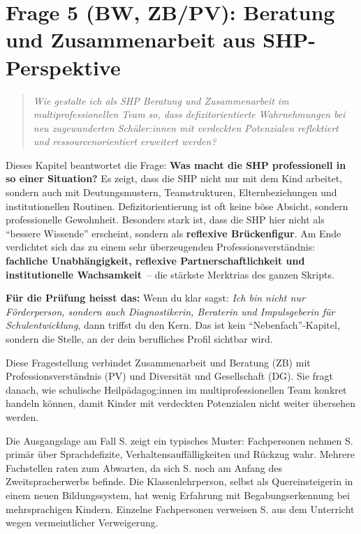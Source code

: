 \documentclass[ngerman, a4paper]{article}
\begin{document}
\newpage
\section{Frage 5 (BW, ZB/PV): Beratung und Zusammenarbeit aus SHP-Perspektive}
\label{sec:frage5}
 
\begin{quote}\itshape
Wie gestalte ich als SHP Beratung und Zusammenarbeit im multiprofessionellen
Team so, dass defizitorientierte Wahrnehmungen bei neu zugewanderten
Schüler:innen mit verdeckten Potenzialen reflektiert und ressourcenorientiert
erweitert werden?
\end{quote}

\begin{kapitelueberblick}
Dieses Kapitel beantwortet die Frage: \textbf{Was macht die SHP professionell in so einer Situation?} Es zeigt, dass die SHP nicht nur mit dem Kind arbeitet, sondern auch mit Deutungsmustern, Teamstrukturen, Elternbeziehungen und institutionellen Routinen. Defizitorientierung ist oft keine böse Absicht, sondern professionelle Gewohnheit. Besonders stark ist, dass die SHP hier nicht als \enquote{bessere Wissende} erscheint, sondern als \textbf{reflexive Brückenfigur}. Am Ende verdichtet sich das zu einem sehr überzeugenden Professionsverständnis: \textbf{fachliche Unabhängigkeit, reflexive Partnerschaftlichkeit und institutionelle Wachsamkeit}~-- die stärkste Merktrias des ganzen Skripts.

\medskip\textbf{Für die Prüfung heisst das:} Wenn du klar sagst: \textit{Ich bin nicht nur Förderperson, sondern auch Diagnostikerin, Beraterin und Impulsgeberin für Schulentwicklung}, dann triffst du den Kern. Das ist kein \enquote{Nebenfach}-Kapitel, sondern die Stelle, an der dein berufliches Profil sichtbar wird.
\end{kapitelueberblick}
 
Diese Fragestellung verbindet Zusammenarbeit und Beratung (ZB) mit
Professionsverständnis (PV) und Diversität und Gesellschaft (DG). Sie fragt danach,
wie schulische Heilpädagog:innen im multiprofessionellen Team konkret handeln können,
damit Kinder mit verdeckten Potenzialen nicht weiter übersehen werden.
 
Die Ausgangslage am Fall S. zeigt ein typisches Muster: Fachpersonen nehmen S. primär
über Sprachdefizite, Verhaltensauffälligkeiten und Rückzug wahr. Mehrere Fachstellen
raten zum Abwarten, da sich S. noch am Anfang des Zweitspracherwerbs befinde. Die
Klassenlehrperson, selbst als Quereinsteigerin in einem neuen Bildungssystem, hat
wenig Erfahrung mit Begabungserkennung bei mehrsprachigen Kindern. Einzelne
Fachpersonen verweisen S. aus dem Unterricht wegen vermeintlicher Verweigerung.
 
\end{document}
